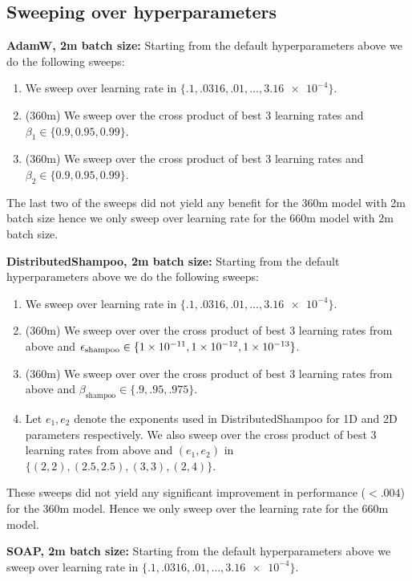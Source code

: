 \documentclass{article} %
\begin{document}
\subsection{Sweeping over hyperparameters}



\textbf{AdamW, 2m batch size:} Starting from the default hyperparameters above we do the following sweeps:
\begin{enumerate}
	\item We sweep over learning rate in $\{.1, .0316, .01,\ldots, \num{3.16e-4}\}$.
	\item (360m) We sweep over the cross product of best 3 learning rates and $\beta_1 \in \{0.9, 0.95, 0.99\}$.
	\item (360m) We sweep over the cross product of best 3 learning rates and $\beta_2 \in \{0.9, 0.95, 0.99\}$.
\end{enumerate}

The last two of the sweeps did not yield any benefit for the 360m model with 2m batch size hence we only sweep over learning rate for the 660m model with 2m batch size. 


\textbf{DistributedShampoo, 2m batch size:} Starting from the default hyperparameters above we do the following sweeps:
\begin{enumerate}
	\item We sweep over learning rate in $\{.1, .0316, .01,\ldots, \num{3.16e-4}\}$.
	\item (360m) We sweep over over the cross product of best 3 learning rates from above and ${\epsilon}_{\text{shampoo}} \in \{\num{1e-11}, \num{1e-12}, \num{1e-13}\}$.
	\item (360m) We sweep over over the cross product of best 3 learning rates from above and $\beta_{\text{shampoo}} \in \{.9, .95, .975\}$.
	\item Let $e_1, e_2$ denote the exponents used in DistributedShampoo for 1D and 2D parameters respectively. We also sweep over the cross product of best 3 learning rates from above and $(e_1, e_2)$ in $\{(2, 2), (2.5, 2.5), (3, 3), (2, 4)\}$.
\end{enumerate}

These sweeps did not yield any significant improvement in performance ($<.004$) for the 360m model. Hence we only sweep over the learning rate for the 660m model.

\textbf{SOAP, 2m batch size:} Starting from the default hyperparameters above we sweep over learning rate in $\{.1, .0316, .01,\ldots, \num{3.16e-4}\}$.
\end{document}
